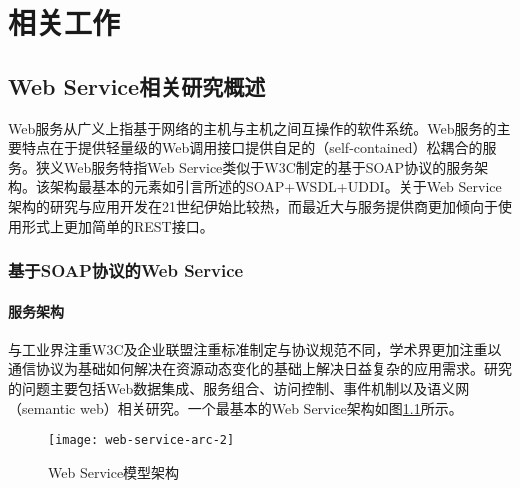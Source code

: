 

\chapter{相关工作}
\section{Web Service相关研究概述}
Web服务从广义上指基于网络的主机与主机之间互操作的软件系统。Web服务的主要特点在于提供轻量级的Web调用接口提供自足的（self-contained）松耦合的服务。狭义Web服务特指Web Service类似于W3C制定的基于SOAP协议的服务架构。该架构最基本的元素如引言所述的SOAP+WSDL+UDDI。关于Web Service架构的研究与应用开发在21世纪伊始比较热，而最近大与服务提供商更加倾向于使用形式上更加简单的REST接口。
\subsection{基于SOAP协议的Web Service}
\subsubsection{服务架构}
与工业界注重W3C及企业联盟注重标准制定与协议规范不同，学术界更加注重以通信协议为基础如何解决在资源动态变化的基础上解决日益复杂的应用需求。研究的问题主要包括Web数据集成、服务组合、访问控制、事件机制以及语义网（semantic web）相关研究。一个最基本的Web Service架构如图\ref{fig:web-service-arc-2}所示。

\begin{figure}[H]
  \centering
  \texttt{[image: web-service-arc-2]}
  \caption{Web Service模型架构}
  \label{fig:web-service-arc-2}
\end{figure}

